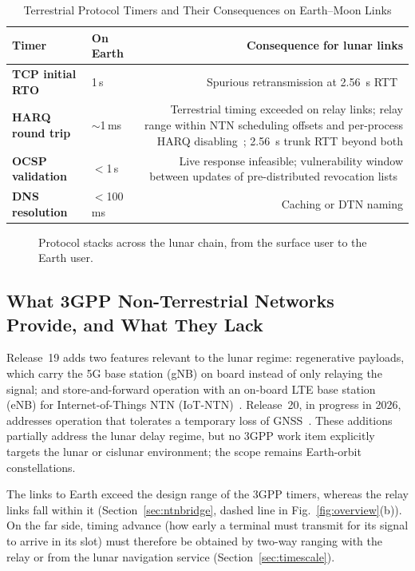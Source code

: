 \documentclass{IEEEoj}
\begin{document}
\begin{table}[!t]
\caption{Terrestrial Protocol Timers and Their Consequences on Earth--Moon Links}
\label{tab:timers}
\centering
\footnotesize
\begin{tabularx}{\columnwidth}{@{}>{\bfseries}llR}
\toprule
{}\textbf{Timer} & \textbf{On Earth} & \textbf{Consequence for lunar links} \\
\midrule
TCP initial RTO & 1\,s~\cite{rfc6298} & Spurious retransmission at \SI{2.56}{s} RTT~\cite{wood_tcp_radius} \\
HARQ round trip & $\sim$1\,ms & Terrestrial timing exceeded on relay links; relay range within NTN scheduling offsets and per-process HARQ disabling~\cite{3gpp_ts_38300}; \SI{2.56}{s} trunk RTT beyond both \\
OCSP validation & $<$1\,s & Live response infeasible; vulnerability window between updates of pre-distributed revocation lists~\cite{koisser_pki_space} \\
DNS resolution & $<$100\,ms & Caching or DTN naming \\
\bottomrule
\end{tabularx}
\end{table}


\begin{figure}[!t]
\centering
\resizebox{\textwidth}{!}{}
\caption{Protocol stacks across the lunar chain, from the surface user to the Earth user.}
\label{fig:stack}
\end{figure}

\subsection{What 3GPP Non-Terrestrial Networks Provide, and What They Lack}
Release~19 adds two features relevant to the lunar regime: regenerative payloads, which carry the 5G base station (gNB) on board instead of only relaying the signal; and store-and-forward operation with an on-board LTE base station (eNB) for Internet-of-Things NTN (IoT-NTN)~\cite{3gpp_rel19_ntn}. Release~20, in progress in 2026, addresses operation that tolerates a temporary loss of GNSS~\cite{3gpp_rp261568}. These additions partially address the lunar delay regime, but no 3GPP work item explicitly targets the lunar or cislunar environment; the scope remains Earth-orbit constellations.

The links to Earth exceed the design range of the 3GPP timers, whereas the relay links fall within it (Section~\ref{sec:ntnbridge}, dashed line in Fig.~\ref{fig:overview}(b)). On the far side, timing advance (how early a terminal must transmit for its signal to arrive in its slot) must therefore be obtained by two-way ranging with the relay or from the lunar navigation service (Section~\ref{sec:timescale}).
\end{document}
